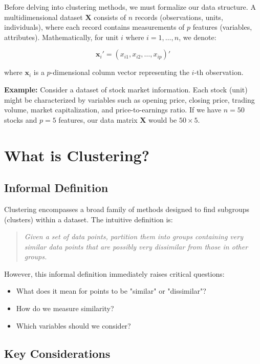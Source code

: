 \documentclass[11pt]{article}
\begin{document}
Before delving into clustering methods, we must formalize our data structure. A multidimensional dataset $\mathbf{X}$ consists of $n$ records (observations, units, individuals), where each record contains measurements of $p$ features (variables, attributes). Mathematically, for unit $i$ where $i = 1, \ldots, n$, we denote:

$$\mathbf{x}_i' = (x_{i1}, x_{i2}, \ldots, x_{ip})'$$

where $\mathbf{x}_i$ is a $p$-dimensional column vector representing the $i$-th observation.

\textbf{Example:} Consider a dataset of stock market information. Each stock (unit) might be characterized by variables such as opening price, closing price, trading volume, market capitalization, and price-to-earnings ratio. If we have $n = 50$ stocks and $p = 5$ features, our data matrix $\mathbf{X}$ would be $50 \times 5$.

\section{What is Clustering?}

\subsection{Informal Definition}

Clustering encompasses a broad family of methods designed to find subgroups (clusters) within a dataset. The intuitive definition is:

\begin{quote}
\textit{Given a set of data points, partition them into groups containing very similar data points that are possibly very dissimilar from those in other groups.}
\end{quote}

However, this informal definition immediately raises critical questions:
\begin{itemize}
    \item What does it mean for points to be "similar" or "dissimilar"?
    \item How do we measure similarity?
    \item Which variables should we consider?
\end{itemize}

\subsection{Key Considerations}
\end{document}
